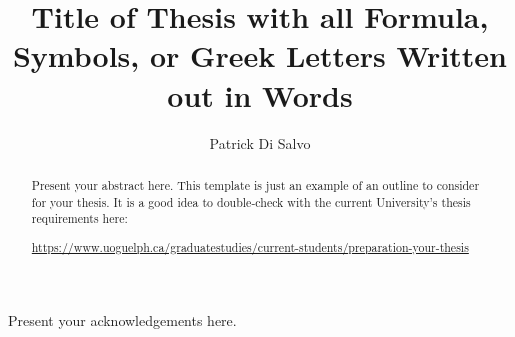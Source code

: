 \documentclass[11pt,draft]{gthesis}
\begin{document}
\title{Title of Thesis with all Formula,  \\ Symbols, or Greek Letters Written out in Words }

\author{Patrick Di Salvo}





\advisorS{}	        		%


\maketitle


\begin{abstract}

Present your abstract here.  This template is just an example of an outline to consider for your thesis.  It is a good idea to double-check with the current University's thesis requirements
here:  

\medskip

\small
\centering
 \url{https://www.uoguelph.ca/graduatestudies/current-students/preparation-your-thesis}

\end{abstract}

\begin{frontmatter}


\begin{acknowledgements}

Present your acknowledgements here.

\end{acknowledgements}



\tableofcontents
\listoftables
\listoffigures

\end{frontmatter}

\dsp


\ssp
  
  
\dsp


\appendix

\end{document}
